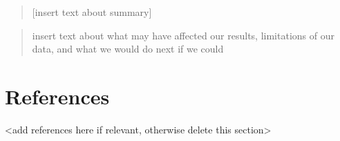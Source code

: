 \documentclass[
  12pt,
]{article}
\begin{document}
\begin{quote}
{[}insert text about summary{]}
\end{quote}

\begin{quote}
insert text about what may have affected our results, limitations of our
data, and what we would do next if we could
\end{quote}

\newpage

\hypertarget{references}{%
\section{References}\label{references}}

\textless add references here if relevant, otherwise delete this
section\textgreater{}
\end{document}

